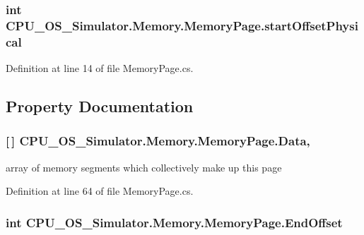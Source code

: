 \subsubsection[{start\+Offset\+Physical}]{\setlength{\rightskip}{0pt plus 5cm}int C\+P\+U\+\_\+\+O\+S\+\_\+\+Simulator.\+Memory.\+Memory\+Page.\+start\+Offset\+Physical\hspace{0.3cm}{\ttfamily [private]}}\label{class_c_p_u___o_s___simulator_1_1_memory_1_1_memory_page_a3cecfb0fe2f91def3db5711180442d44}


Definition at line 14 of file Memory\+Page.\+cs.



\subsection{Property Documentation}
\hypertarget{class_c_p_u___o_s___simulator_1_1_memory_1_1_memory_page_a8bf84e82146f9ff35ffbcc32b93a9db0}{}
\subsubsection[{Data}]{ \mbox{[}$\,$\mbox{]} C\+P\+U\+\_\+\+O\+S\+\_\+\+Simulator.\+Memory.\+Memory\+Page.\+Data\hspace{0.3cm}{\ttfamily [get]}, {\ttfamily [set]}}\label{class_c_p_u___o_s___simulator_1_1_memory_1_1_memory_page_a8bf84e82146f9ff35ffbcc32b93a9db0}


array of memory segments which collectively make up this page 



Definition at line 64 of file Memory\+Page.\+cs.

\hypertarget{class_c_p_u___o_s___simulator_1_1_memory_1_1_memory_page_abe850b4a088a820ecf598af1cd9a7deb}{}
\subsubsection[{End\+Offset}]{\setlength{\rightskip}{0pt plus 5cm}int C\+P\+U\+\_\+\+O\+S\+\_\+\+Simulator.\+Memory.\+Memory\+Page.\+End\+Offset\hspace{0.3cm}{\ttfamily [get]}}\label{class_c_p_u___o_s___simulator_1_1_memory_1_1_memory_page_abe850b4a088a820ecf598af1cd9a7deb}


